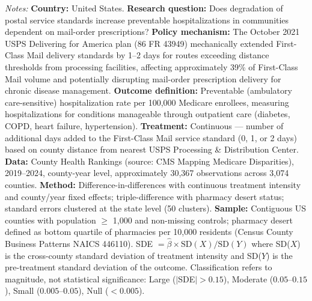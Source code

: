 \begin{table}[htbp]
\begin{tablenotes}[flushleft]
\item \textit{Notes:} \textbf{Country:} United States. \textbf{Research question:} Does degradation of postal service standards increase preventable hospitalizations in communities dependent on mail-order prescriptions? \textbf{Policy mechanism:} The October 2021 USPS Delivering for America plan (86 FR 43949) mechanically extended First-Class Mail delivery standards by 1--2 days for routes exceeding distance thresholds from processing facilities, affecting approximately 39\% of First-Class Mail volume and potentially disrupting mail-order prescription delivery for chronic disease management. \textbf{Outcome definition:} Preventable (ambulatory care-sensitive) hospitalization rate per 100,000 Medicare enrollees, measuring hospitalizations for conditions manageable through outpatient care (diabetes, COPD, heart failure, hypertension). \textbf{Treatment:} Continuous --- number of additional days added to the First-Class Mail service standard (0, 1, or 2 days) based on county distance from nearest USPS Processing \& Distribution Center. \textbf{Data:} County Health Rankings (source: CMS Mapping Medicare Disparities), 2019--2024, county-year level, approximately 30,367 observations across 3,074 counties. \textbf{Method:} Difference-in-differences with continuous treatment intensity and county/year fixed effects; triple-difference with pharmacy desert status; standard errors clustered at the state level (50 clusters). \textbf{Sample:} Contiguous US counties with population $\geq$ 1,000 and non-missing controls; pharmacy desert defined as bottom quartile of pharmacies per 10,000 residents (Census County Business Patterns NAICS 446110). SDE $= \hat{\beta} \times \text{SD}(X) / \text{SD}(Y)$ where SD($X$) is the cross-county standard deviation of treatment intensity and SD($Y$) is the pre-treatment standard deviation of the outcome. Classification refers to magnitude, not statistical significance: Large ($|$SDE$| > 0.15$), Moderate ($0.05$--$0.15$), Small ($0.005$--$0.05$), Null ($< 0.005$).
\end{tablenotes}
\end{table}
